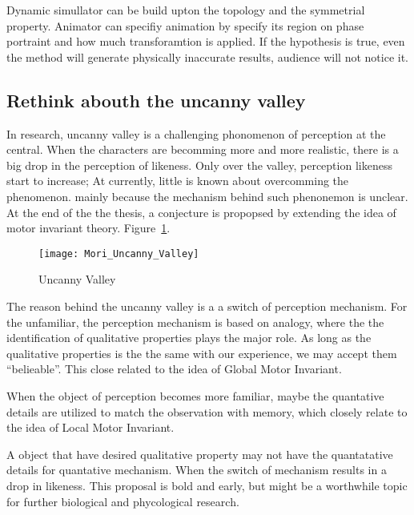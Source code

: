 Dynamic simullator can be build upton the topology and the symmetrial property.
Animator can specifiy animation by specify its region on phase portraint and how much transforamtion is applied.
If the hypothesis is true, even the method will generate physically inaccurate results, audience will not notice it.

\subsection{Rethink abouth the uncanny valley}
In \cms research, uncanny valley is a challenging phonomenon of perception at the  central. 
When the characters are becomming more and more realistic, there is a big drop in the perception of likeness.
Only over the valley, perception likeness start to increase;
At currently, little is known about overcomming the phenomenon.
mainly because the mechanism behind such phenonemon is unclear.
At the end of the the thesis, a conjecture is propopsed by extending the idea of motor invariant theory.
Figure~\ref{fig:uncannyValley}.

\begin{figure}[!htbp]
  \begin{center}
      \texttt{[image: Mori\_Uncanny\_Valley]}
    \caption{Uncanny Valley}
    \label{fig:uncannyValley}
\end{center}
\end{figure}

The reason behind the uncanny valley is a  a switch of perception mechanism.
For the unfamiliar, the perception mechanism is based on analogy,
where the the identification of qualitative properties plays the major role.
As long as the qualitative properties is the the same with our experience, we may accept them ``belieable''.
This close related to the idea of Global Motor Invariant.

When the object of perception becomes more familiar, 
maybe the quantative details are utilized to match the observation with memory,
which closely relate to the idea of Local Motor Invariant.


A object that have desired qualitative property may not have the quantatative details for quantative mechanism.
When the switch of mechanism results in a drop in likeness.
This proposal is bold and early, but might be a worthwhile topic for further biological and phycological research.







